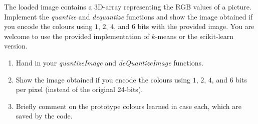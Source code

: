 \documentclass{article}
\def\blu#1{{\color{blu}#1}}
\def\enum#1{\begin{enumerate}#1\end{enumerate}}
\begin{document}
The loaded image contains a 3D-array representing the RGB values of a picture.
\blu{Implement the \emph{quantize} and \emph{dequantize} functions and show the image
obtained if you encode the colours using $1$, $2$, $4$, and $6$ bits with the provided image.}
You are welcome to use the provided implementation of $k$-means or the scikit-learn version.


\blu{\enum{
\item Hand in your \emph{quantizeImage} and \emph{deQuantizeImage} functions.
\item Show the image obtained if you encode the colours using $1$, $2$, $4$, and $6$ bits per pixel (instead of the original 24-bits).
\item Briefly comment on the prototype colours learned in case each, which are saved by the code.
}}
\end{document}
